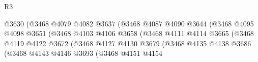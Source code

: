 \begin{lexlean}{R3}
\begin{coremodule}
                                                  @3630
                                                  (@3468
                                                    @4079
                                                    @4082
                                                    @3637
                                                    (@3468
                                                      @4087
                                                      @4090
                                                      @3644
                                                      (@3468
                                                        @4095
                                                        @4098
                                                        @3651
                                                        (@3468
                                                          @4103
                                                          @4106
                                                          @3658
                                                          (@3468
                                                            @4111
                                                            @4114
                                                            @3665
                                                            (@3468
                                                              @4119
                                                              @4122
                                                              @3672
                                                              (@3468
                                                                @4127
                                                                @4130
                                                                @3679
                                                                (@3468
                                                                  @4135
                                                                  @4138
                                                                  @3686
                                                                  (@3468
                                                                    @4143
                                                                    @4146
                                                                    @3693
                                                                    (@3468
                                                                      @4151
                                                                      @4154

\end{coremodule}
\end{lexlean}
